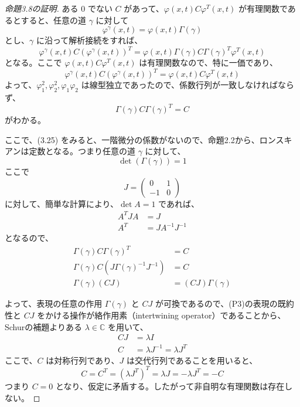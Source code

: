 \begin{story}
\begin{proof}[命題3.8の証明]
ある $0$ でない $C$ があって、$\varphi(x,t) C \varphi^{T}(x,t)$ が有理関数であるとすると、任意の道 $\gamma$ に対して
\begin{equation*}
    \varphi^{\gamma}(x,t) = \varphi(x,t)\Gamma(\gamma)
\end{equation*}
とし、$\gamma$ に沿って解析接続をすれば、
\begin{equation*}
    \varphi^{\gamma}(x,t) C (\varphi^{\gamma}(x,t))^{T} = \varphi(x,t)\Gamma(\gamma) C \Gamma(\gamma)^{T}\varphi^{T}(x,t)
\end{equation*}
となる。ここで $\varphi(x,t) C \varphi^{T}(x,t)$ は有理関数なので、特に一価であり、
\begin{equation*}
    \varphi^{\gamma}(x,t) C (\varphi^{\gamma}(x,t))^{T} = \varphi(x,t) C \varphi^{T}(x,t)
\end{equation*}
よって、$\varphi_1^2, \varphi_2^2, \varphi_1\varphi_2$ は線型独立であったので、係数行列が一致しなければならず、
\begin{equation*}
    \Gamma(\gamma) C \Gamma(\gamma)^{T} = C
\end{equation*}
がわかる。

ここで、(3.25) をみると、一階微分の係数がないので、命題2.2から、ロンスキアンは定数となる。つまり任意の道 $\gamma$ に対して、
\begin{equation*}
    \det(\Gamma(\gamma)) = 1
\end{equation*}
ここで
\begin{equation*}
    J =
    \begin{pmatrix}
        0 & 1 \\
        -1 & 0
    \end{pmatrix}
\end{equation*}
に対して、簡単な計算により、$\det A = 1$ であれば、
\begin{align*}
    A^{T}JA &= J \\
    A^{T} &= JA^{-1}J^{-1}
\end{align*}
となるので、
\begin{align*}
    \Gamma(\gamma) C \Gamma(\gamma)^{T} &= C \\
    \Gamma(\gamma) C (J\Gamma(\gamma)^{-1}J^{-1}) &= C \\
    \Gamma(\gamma) (CJ) &= (CJ)\Gamma(\gamma)
\end{align*}

よって、表現の任意の作用 $\Gamma(\gamma)$ と $CJ$ が可換であるので、(P3)の表現の既約性と $CJ$ をかける操作が絡作用素（intertwining operator）であることから、Schurの補題よりある $\lambda\in\mathbb{C}$ を用いて、
\begin{align*}
    CJ &= \lambda I \\
    C &= \lambda J^{-1} = \lambda J^{T}
\end{align*}
ここで、$C$ は対称行列であり、$J$ は交代行列であることを用いると、
\begin{equation*}
    C = C^{T} = (\lambda J^{T})^{T} = \lambda J = -\lambda J^{T} = -C
\end{equation*}
つまり $C=0$ となり、仮定に矛盾する。したがって非自明な有理関数は存在しない。


\end{proof}
\end{story}

